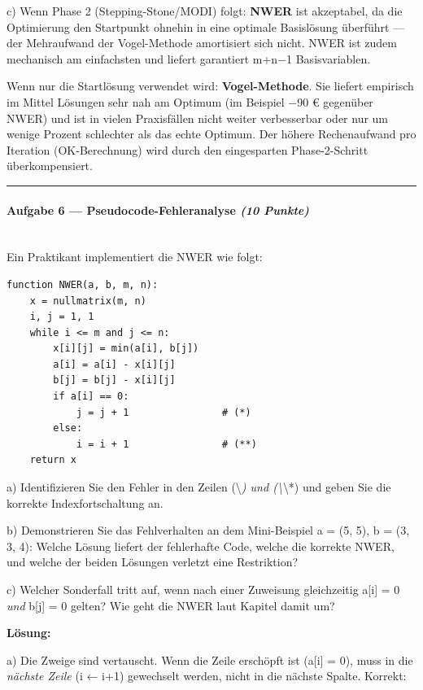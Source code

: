 \documentclass[11pt, a4paper]{article}
\begin{document}
c) Wenn Phase 2 (Stepping-Stone/MODI) folgt: \textbf{NWER} ist akzeptabel, da die Optimierung den Startpunkt ohnehin in eine optimale Basislösung überführt — der Mehraufwand der Vogel-Methode amortisiert sich nicht. NWER ist zudem mechanisch am einfachsten und liefert garantiert m+n−1 Basisvariablen.


Wenn nur die Startlösung verwendet wird: \textbf{Vogel-Methode}. Sie liefert empirisch im Mittel Lösungen sehr nah am Optimum (im Beispiel −90 € gegenüber NWER) und ist in vielen Praxisfällen nicht weiter verbesserbar oder nur um wenige Prozent schlechter als das echte Optimum. Der höhere Rechenaufwand pro Iteration (OK-Berechnung) wird durch den eingesparten Phase-2-Schritt überkompensiert.



\noindent\textcolor{rulegray}{\rule{\linewidth}{0.4pt}}


\paragraph{Aufgabe 6 — Pseudocode-Fehleranalyse \textit{(10 Punkte)}}\mbox{}\\[2pt]

Ein Praktikant implementiert die NWER wie folgt:


\begin{lstlisting}
function NWER(a, b, m, n):
    x = nullmatrix(m, n)
    i, j = 1, 1
    while i <= m and j <= n:
        x[i][j] = min(a[i], b[j])
        a[i] = a[i] - x[i][j]
        b[j] = b[j] - x[i][j]
        if a[i] == 0:
            j = j + 1                # (*)
        else:
            i = i + 1                # (**)
    return x
\end{lstlisting}


a) Identifizieren Sie den Fehler in den Zeilen (\textbackslash{}\textit{) und (\textbackslash{}}\textbackslash{}*) und geben Sie die korrekte Indexfortschaltung an.

b) Demonstrieren Sie das Fehlverhalten an dem Mini-Beispiel a = (5, 5), b = (3, 3, 4): Welche Lösung liefert der fehlerhafte Code, welche die korrekte NWER, und welche der beiden Lösungen verletzt eine Restriktion?

c) Welcher Sonderfall tritt auf, wenn nach einer Zuweisung gleichzeitig a[i] = 0 \textit{und} b[j] = 0 gelten? Wie geht die NWER laut Kapitel damit um?


\textbf{Lösung:}


a) Die Zweige sind vertauscht. Wenn die Zeile erschöpft ist (a[i] = 0), muss in die \textit{nächste Zeile} (i ← i+1) gewechselt werden, nicht in die nächste Spalte. Korrekt:
\end{document}
